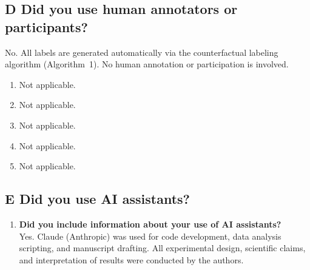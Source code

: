 \subsection*{D \quad Did you use human annotators or participants?}

No. All labels are generated automatically via the counterfactual labeling algorithm (Algorithm~1). No human annotation or participation is involved.

\begin{enumerate}
\item[\textbf{D1.}] Not applicable.
\item[\textbf{D2.}] Not applicable.
\item[\textbf{D3.}] Not applicable.
\item[\textbf{D4.}] Not applicable.
\item[\textbf{D5.}] Not applicable.
\end{enumerate}

\subsection*{E \quad Did you use AI assistants?}

\begin{enumerate}
\item[\textbf{E1.}] \textbf{Did you include information about your use of AI assistants?}\\
Yes. Claude (Anthropic) was used for code development, data analysis scripting, and manuscript drafting. All experimental design, scientific claims, and interpretation of results were conducted by the authors.
\end{enumerate}

